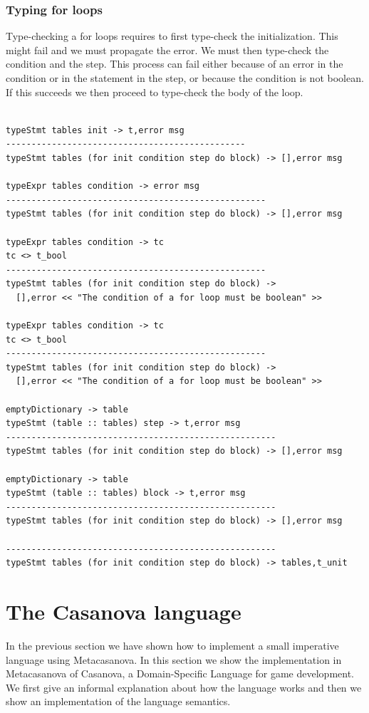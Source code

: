 \subsubsection{Typing for loops}
Type-checking a for loops requires to first type-check the initialization. This might fail and we must propagate the error. We must then type-check the condition and the step. This process can fail either because of an error in the condition or in the statement in the step, or because the condition is not boolean.  If this succeeds we then proceed to type-check the body of the loop.
\begin{lstlisting}

typeStmt tables init -> t,error msg
-----------------------------------------------
typeStmt tables (for init condition step do block) -> [],error msg

typeExpr tables condition -> error msg
---------------------------------------------------
typeStmt tables (for init condition step do block) -> [],error msg

typeExpr tables condition -> tc
tc <> t_bool
---------------------------------------------------
typeStmt tables (for init condition step do block) -> 
  [],error << "The condition of a for loop must be boolean" >>
  
typeExpr tables condition -> tc
tc <> t_bool
---------------------------------------------------
typeStmt tables (for init condition step do block) -> 
  [],error << "The condition of a for loop must be boolean" >>

emptyDictionary -> table
typeStmt (table :: tables) step -> t,error msg  
-----------------------------------------------------
typeStmt tables (for init condition step do block) -> [],error msg

emptyDictionary -> table
typeStmt (table :: tables) block -> t,error msg  
-----------------------------------------------------
typeStmt tables (for init condition step do block) -> [],error msg

-----------------------------------------------------
typeStmt tables (for init condition step do block) -> tables,t_unit
\end{lstlisting}

\section{The Casanova language}
In the previous section we have shown how to implement a small imperative language using Metacasanova. In this section we show the implementation in Metacasanova of Casanova, a Domain-Specific Language for game development. We first give an informal explanation about how the language works and then we show an implementation of the language semantics.

